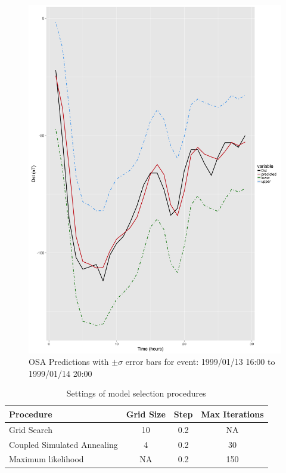 \documentclass{article}
\begin{document}
\begin{figure}[h]
\includegraphics[width=\textwidth]{PredictionsModel1/PredErrBars_Storm9.png}
\caption{OSA Predictions with $\pm \sigma$ error bars for event: 1999/01/13 16:00 to 1999/01/14 20:00}
\label{fig:ComparePred3}
\end{figure}




\begin{table}[h]
\centering
\caption{Settings of model selection procedures}
\begin{tabular}{l c c c}
\hline
Procedure & Grid Size & Step & Max Iterations \\
\hline
Grid Search & 10 & 0.2 & NA \\
Coupled Simulated Annealing & 4 & 0.2 & 30 \\
Maximum likelihood & NA & 0.2 & 150\\
\end{tabular}
\label{table:modelselection}
\end{table}
\end{document}

